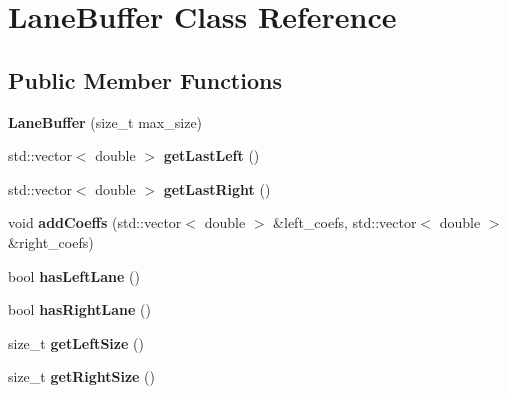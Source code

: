\hypertarget{classLaneBuffer}{}\section{Lane\+Buffer Class Reference}
\label{classLaneBuffer}
\subsection*{Public Member Functions}
\begin{DoxyCompactItemize}
\item 
\mbox{\label{classLaneBuffer_a28001137e1ad1e0364d60d747e76c96e}} 
{\bfseries Lane\+Buffer} (size\+\_\+t max\+\_\+size)
\item 
\mbox{\label{classLaneBuffer_aace7ec7b4c42278ee7fa628133308e6e}} 
std\+::vector$<$ double $>$ {\bfseries get\+Last\+Left} ()
\item 
\mbox{\label{classLaneBuffer_a2b7ad2f7ce41a723eaaf75aa11af16c4}} 
std\+::vector$<$ double $>$ {\bfseries get\+Last\+Right} ()
\item 
\mbox{\label{classLaneBuffer_a14620e6321b73076f67ddff2dd751da0}} 
void {\bfseries add\+Coeffs} (std\+::vector$<$ double $>$ \&left\+\_\+coefs, std\+::vector$<$ double $>$ \&right\+\_\+coefs)
\item 
\mbox{\label{classLaneBuffer_a1fef01a11888d2ecbd9b4fea74a804e6}} 
bool {\bfseries has\+Left\+Lane} ()
\item 
\mbox{\label{classLaneBuffer_a209a951ff1fe55079eb5b8554c55b93d}} 
bool {\bfseries has\+Right\+Lane} ()
\item 
\mbox{\label{classLaneBuffer_a3cf22e3f47f14a851a99686fcdc35cfe}} 
size\+\_\+t {\bfseries get\+Left\+Size} ()
\item 
\mbox{\label{classLaneBuffer_a8d9c5d68d724bcacbe96092d98fc6ad1}} 
size\+\_\+t {\bfseries get\+Right\+Size} ()
\end{DoxyCompactItemize}
